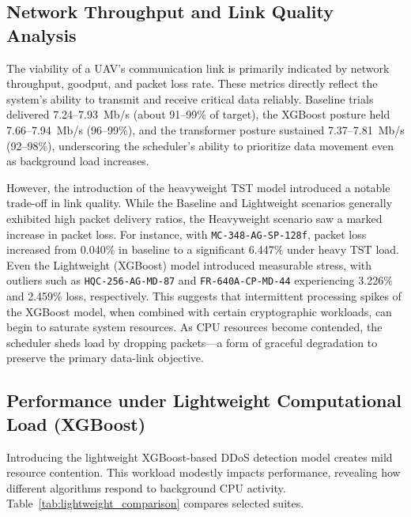 \documentclass[sigconf,natbib=false]{acmart}
\begin{document}
\subsection{Network Throughput and Link Quality Analysis}

The viability of a UAV's communication link is primarily indicated by network throughput, goodput, and packet loss rate. These metrics directly reflect the system's ability to transmit and receive critical data reliably. Baseline trials delivered 7.24--7.93~Mb/s (about 91--99\% of target), the XGBoost posture held 7.66--7.94~Mb/s (96--99\%), and the transformer posture sustained 7.37--7.81~Mb/s (92--98\%), underscoring the scheduler's ability to prioritize data movement even as background load increases.

However, the introduction of the heavyweight TST model introduced a notable trade-off in link quality. While the Baseline and Lightweight scenarios generally exhibited high packet delivery ratios, the Heavyweight scenario saw a marked increase in packet loss. For instance, with \texttt{MC-348-AG-SP-128f}, packet loss increased from 0.040\% in baseline to a significant 6.447\% under heavy TST load. Even the Lightweight (XGBoost) model introduced measurable stress, with outliers such as \texttt{HQC-256-AG-MD-87} and \texttt{FR-640A-CP-MD-44} experiencing 3.226\% and 2.459\% loss, respectively. This suggests that intermittent processing spikes of the XGBoost model, when combined with certain cryptographic workloads, can begin to saturate system resources. As CPU resources become contended, the scheduler sheds load by dropping packets---a form of graceful degradation to preserve the primary data-link objective.

\subsection{Performance under Lightweight Computational Load (XGBoost)}

Introducing the lightweight XGBoost-based DDoS detection model creates mild resource contention. This workload modestly impacts performance, revealing how different algorithms respond to background CPU activity. Table~\ref{tab:lightweight_comparison} compares selected suites.
\end{document}
